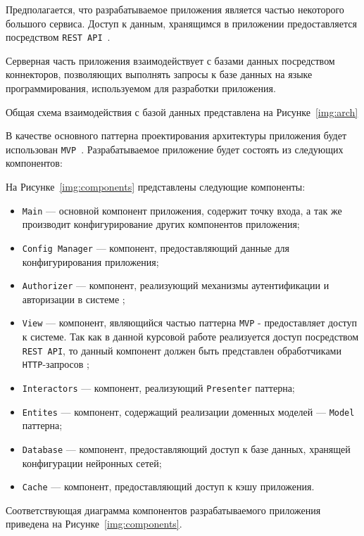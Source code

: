 Предполагается, что разрабатываемое приложения является частью некоторого большого сервиса. Доступ к данным, хранящимся в приложении предоставляется посредством \texttt{REST API}~\cite{rest}.

Серверная часть приложения взаимодействует с базами данных посредством коннекторов, позволяющих выполнять запросы к базе данных на языке программирования, используемом для разработки приложения.

Общая схема взаимодействия с базой данных представлена на Рисунке~\ref{img:arch}


В качестве основного паттерна проектирования архитектуры приложения будет использован \texttt{MVP}~\cite{mvp}. Разрабатываемое приложение будет состоять из следующих компонентов:

На Рисунке~\ref{img:components} представлены следующие компоненты:
\begin{itemize}
    \item \texttt{Main} --- основной компонент приложения, содержит точку входа, а так же производит конфигурирование других компонентов приложения;
    \item \texttt{Config Manager} --- компонент, предоставляющий данные для конфигурирования приложения;
    \item \texttt{Authorizer} --- компонент, реализующий механизмы аутентификации и авторизации в системе \cite{auth};
    \item \texttt{View} --- компонент, являющийся частью паттерна \texttt{MVP} - предоставляет доступ к системе. Так как в данной курсовой работе реализуется доступ посредством \texttt{REST API}, то данный компонент должен быть представлен обработчиками \texttt{HTTP}-запросов \cite{http};
    \item \texttt{Interactors} --- компонент, реализующий \texttt{Presenter} паттерна;
    \item \texttt{Entites} --- компонент, содержащий реализации доменных моделей --- \texttt{Model} паттерна;
    \item \texttt{Database} --- компонент, предоставляющий доступ к базе данных, хранящей конфигурации нейронных сетей;
    \item \texttt{Cache} --- компонент, предоставляющий доступ к кэшу приложения.
\end{itemize}

Соответствующая диаграмма компонентов разрабатываемого приложения приведена на Рисунке~\ref{img:components}.

